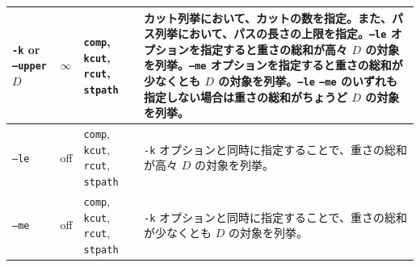 \documentclass{jsarticle}
\begin{document}
\begin{table}
\begin{center}
\begin{tabular}[t]{|p{120pt}|p{50pt}|p{80pt}|p{180pt}|}
\texttt{-k} or \texttt{--upper} $D$ & $\infty$ & \texttt{comp}, \texttt{kcut}, \texttt{rcut}, \texttt{stpath} & カット列挙において、カットの数を指定。また、パス列挙において、パスの長さの上限を指定。\texttt{--le} オプションを指定すると重さの総和が高々 $D$ の対象を列挙。\texttt{--me} オプションを指定すると重さの総和が少なくとも $D$ の対象を列挙。\texttt{--le}  \texttt{--me} のいずれも指定しない場合は重さの総和がちょうど $D$ の対象を列挙。 \\ \hline
\texttt{--le} & off & \texttt{comp}, \texttt{kcut}, \texttt{rcut}, \texttt{stpath} & \texttt{-k} オプションと同時に指定することで、重さの総和が高々 $D$ の対象を列挙。 \\ \hline
\texttt{--me} & off & \texttt{comp}, \texttt{kcut}, \texttt{rcut}, \texttt{stpath} & \texttt{-k} オプションと同時に指定することで、重さの総和が少なくとも $D$ の対象を列挙。 \\ \hline
\end{tabular}
\end{center}
\end{table}
\end{document}
